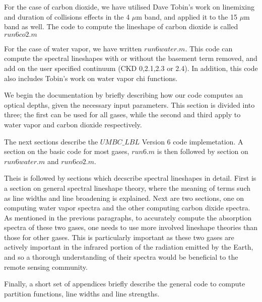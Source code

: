 \documentclass[11pt]{article}
\begin{document}
For the case of carbon dioxide, we have utilised Dave Tobin's work on 
linemixing and duration of collisions effects in the 4 $\mu$m band, and
applied it to the 15 $\mu$m band as well. The code to compute the lineshape 
of carbon dioxide is called $run6co2.m$

For the case of water vapor, we have written $run6water.m$. This code can 
compute the spectral lineshapes with or without the basement term removed,
and add on the user specified continuum (CKD 0,2.1,2.3 or 2.4). In addition,
this code also includes Tobin's work on water vapor chi functions.

We begin the documentation by briefly describing how our code computes an 
optical depths, given the necessary input parameters. This section is 
divided into three; the first can be used for all gases, while the second 
and third apply to water vapor and carbon dioxide respectively.

The next sections describe the $UMBC\_LBL$ Version 6 code implemetation. 
A section on the basic code for most gases, $run6.m$ is then followed by 
section on $run6water.m$ and $run6co2.m$.

Theis is followed by sections which decscribe spectral 
lineshapes in detail. First is a section  on general spectral lineshape 
theory, where the meaning of terms such as line widths and line broadening 
is explained. Next are two sections, one on 
computing water vapor spectra and the other computing carbon dixide 
spectra. As mentioned in the previous paragraphs, to accurately compute 
the absorption spectra of these two gases, one needs to use more involved 
lineshape theories than those for other gases. This is particularly 
important as these two gases are actively important in the infrared 
portion of the radiation emitted by the Earth, and so a thorough 
understanding of their spectra would be beneficial to the remote sensing 
community. 
 
Finally, a short set of appendices briefly describe the general code to 
compute partition functions, line widths and line strengths. 

\newpage
\end{document}
